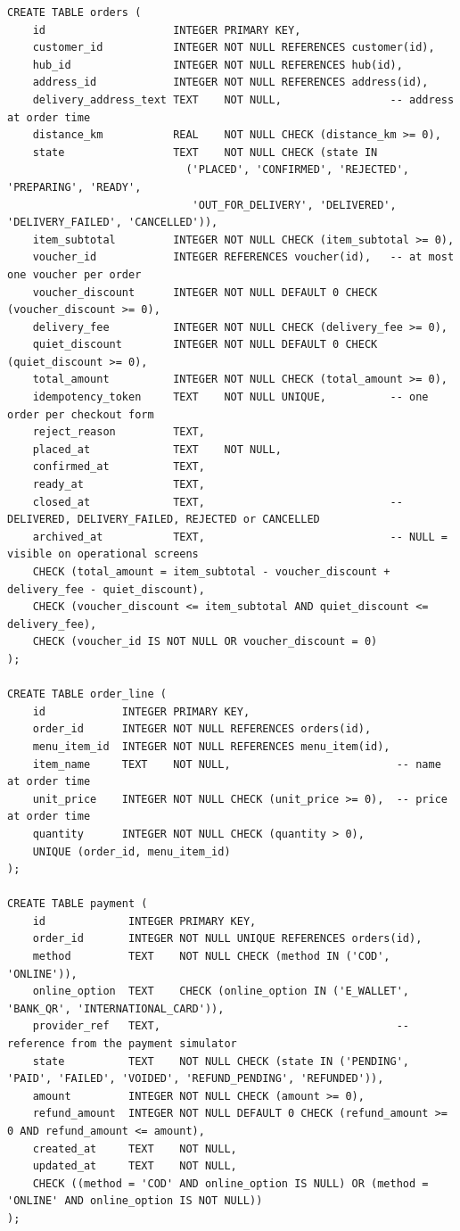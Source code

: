 \begin{lstlisting}
CREATE TABLE orders (
    id                    INTEGER PRIMARY KEY,
    customer_id           INTEGER NOT NULL REFERENCES customer(id),
    hub_id                INTEGER NOT NULL REFERENCES hub(id),
    address_id            INTEGER NOT NULL REFERENCES address(id),
    delivery_address_text TEXT    NOT NULL,                 -- address at order time
    distance_km           REAL    NOT NULL CHECK (distance_km >= 0),
    state                 TEXT    NOT NULL CHECK (state IN
                            ('PLACED', 'CONFIRMED', 'REJECTED', 'PREPARING', 'READY',
                             'OUT_FOR_DELIVERY', 'DELIVERED', 'DELIVERY_FAILED', 'CANCELLED')),
    item_subtotal         INTEGER NOT NULL CHECK (item_subtotal >= 0),
    voucher_id            INTEGER REFERENCES voucher(id),   -- at most one voucher per order
    voucher_discount      INTEGER NOT NULL DEFAULT 0 CHECK (voucher_discount >= 0),
    delivery_fee          INTEGER NOT NULL CHECK (delivery_fee >= 0),
    quiet_discount        INTEGER NOT NULL DEFAULT 0 CHECK (quiet_discount >= 0),
    total_amount          INTEGER NOT NULL CHECK (total_amount >= 0),
    idempotency_token     TEXT    NOT NULL UNIQUE,          -- one order per checkout form
    reject_reason         TEXT,
    placed_at             TEXT    NOT NULL,
    confirmed_at          TEXT,
    ready_at              TEXT,
    closed_at             TEXT,                             -- DELIVERED, DELIVERY_FAILED, REJECTED or CANCELLED
    archived_at           TEXT,                             -- NULL = visible on operational screens
    CHECK (total_amount = item_subtotal - voucher_discount + delivery_fee - quiet_discount),
    CHECK (voucher_discount <= item_subtotal AND quiet_discount <= delivery_fee),
    CHECK (voucher_id IS NOT NULL OR voucher_discount = 0)
);

CREATE TABLE order_line (
    id            INTEGER PRIMARY KEY,
    order_id      INTEGER NOT NULL REFERENCES orders(id),
    menu_item_id  INTEGER NOT NULL REFERENCES menu_item(id),
    item_name     TEXT    NOT NULL,                          -- name at order time
    unit_price    INTEGER NOT NULL CHECK (unit_price >= 0),  -- price at order time
    quantity      INTEGER NOT NULL CHECK (quantity > 0),
    UNIQUE (order_id, menu_item_id)
);

CREATE TABLE payment (
    id             INTEGER PRIMARY KEY,
    order_id       INTEGER NOT NULL UNIQUE REFERENCES orders(id),
    method         TEXT    NOT NULL CHECK (method IN ('COD', 'ONLINE')),
    online_option  TEXT    CHECK (online_option IN ('E_WALLET', 'BANK_QR', 'INTERNATIONAL_CARD')),
    provider_ref   TEXT,                                     -- reference from the payment simulator
    state          TEXT    NOT NULL CHECK (state IN ('PENDING', 'PAID', 'FAILED', 'VOIDED', 'REFUND_PENDING', 'REFUNDED')),
    amount         INTEGER NOT NULL CHECK (amount >= 0),
    refund_amount  INTEGER NOT NULL DEFAULT 0 CHECK (refund_amount >= 0 AND refund_amount <= amount),
    created_at     TEXT    NOT NULL,
    updated_at     TEXT    NOT NULL,
    CHECK ((method = 'COD' AND online_option IS NULL) OR (method = 'ONLINE' AND online_option IS NOT NULL))
);


\end{lstlisting}
